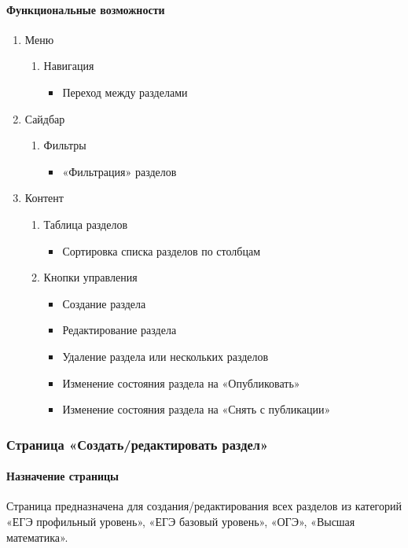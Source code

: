 \paragraph{Функциональные возможности}
\begin{enumerate}
	\item Меню
	\begin{enumerate}
		\item Навигация
		\begin{itemize}
			\item Переход между разделами
		\end{itemize}
	\end{enumerate}

	\item Сайдбар
	\begin{enumerate}
		\item Фильтры
		\begin{itemize}
			\item «Фильтрация» разделов
		\end{itemize}
	\end{enumerate}

	\item Контент
	\begin{enumerate}
		\item Таблица разделов
		\begin{itemize}
			\item Сортировка списка разделов по столбцам
		\end{itemize}

		\item Кнопки управления
		\begin{itemize}
			\item Создание раздела
			\item Редактирование раздела
			\item Удаление раздела или нескольких разделов
			\item Изменение состояния раздела на «Опубликовать»
			\item Изменение состояния раздела на «Снять с публикации»
		\end{itemize}
	\end{enumerate}
\end{enumerate}

\subsubsection{Страница «Создать/редактировать раздел»}
\paragraph{Назначение страницы}
Страница предназначена для создания/редактирования всех разделов из категорий «ЕГЭ профильный уровень», «ЕГЭ базовый уровень», «ОГЭ», «Высшая математика».


